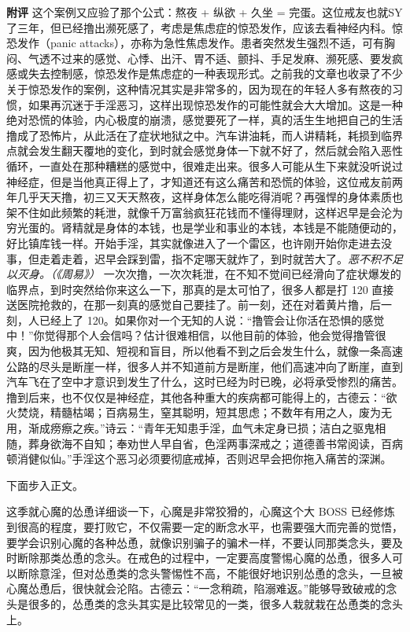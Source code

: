 \begin{case}
    \textbf{附评} 这个案例又应验了那个公式：熬夜 + 纵欲 + 久坐 = 完蛋。这位戒友也就SY了三年，但已经撸出濒死感了，考虑是焦虑症的惊恐发作，应该去看神经内科。惊恐发作（panic attacks），亦称为急性焦虑发作。患者突然发生强烈不适，可有胸闷、气透不过来的感觉、心悸、出汗、胃不适、颤抖、手足发麻、濒死感、要发疯感或失去控制感，惊恐发作是焦虑症的一种表现形式。之前我的文章也收录了不少关于惊恐发作的案例，这种情况其实是非常多的，因为现在的年轻人多有熬夜的习惯，如果再沉迷于手淫恶习，这样出现惊恐发作的可能性就会大大增加。这是一种绝对恐慌的体验，内心极度的崩溃，感觉要死了一样，真的活生生地把自己的生活撸成了恐怖片，从此活在了症状地狱之中。汽车讲油耗，而人讲精耗，耗损到临界点就会发生翻天覆地的变化，到时就会感觉身体一下就不好了，然后就会陷入恶性循环，一直处在那种糟糕的感觉中，很难走出来。很多人可能从生下来就没听说过神经症，但是当他真正得上了，才知道还有这么痛苦和恐慌的体验，这位戒友前两年几乎天天撸，初三又天天熬夜，这样身体怎么能吃得消呢？再强悍的身体素质也架不住如此频繁的耗泄，就像千万富翁疯狂花钱而不懂得理财，这样迟早是会沦为穷光蛋的。肾精就是身体的本钱，也是学业和事业的本钱，本钱是不能随便动的，好比镇库钱一样。开始手淫，其实就像进入了一个雷区，也许刚开始你走进去没事，但走着走着，迟早会踩到雷，指不定哪天就炸了，到时就苦大了。\textit{恶不积不足以灭身。（《周易》）} 一次次撸，一次次耗泄，在不知不觉间已经滑向了症状爆发的临界点，到时突然给你来这么一下，那真的是太可怕了，很多人都是打 120 直接送医院抢救的，在那一刻真的感觉自己要挂了。前一刻，还在对着黄片撸，后一刻，人已经上了 120。如果你对一个无知的人说：“撸管会让你活在恐惧的感觉中！”你觉得那个人会信吗？估计很难相信，以他目前的体验，他会觉得撸管很爽，因为他极其无知、短视和盲目，所以他看不到之后会发生什么，就像一条高速公路的尽头是断崖一样，很多人并不知道前方是断崖，他们高速冲向了断崖，直到汽车飞在了空中才意识到发生了什么，这时已经为时已晚，必将承受惨烈的痛苦。撸到后来，也不仅仅是神经症，其他各种重大的疾病都可能得上的，古德云：“欲火焚烧，精髓枯竭；百病易生，窒其聪明，短其思虑；不数年有用之人，废为无用，渐成痨瘵之疾。”诗云：“青年无知患手淫，血气未定身已损；洁白之驱鬼相随，葬身欲海不自知；奉劝世人早自省，色淫两事深戒之；道德善书常阅读，百病顿消健似仙。”手淫这个恶习必须要彻底戒掉，否则迟早会把你拖入痛苦的深渊。
\end{case}

下面步入正文。

这季就心魔的怂恿详细谈一下，心魔是非常狡猾的，心魔这个大 BOSS 已经修炼到很高的程度，要打败它，不仅需要一定的断念水平，也需要强大而完善的觉悟，要学会识别心魔的各种怂恿，就像识别骗子的骗术一样，不要认同那类念头，要及时断除那类怂恿的念头。在戒色的过程中，一定要高度警惕心魔的怂恿，很多人可以断除意淫，但对怂恿类的念头警惕性不高，不能很好地识别怂恿的念头，一旦被心魔怂恿后，很快就会沦陷。古德云：“一念稍疏，陷溺难返。”能够导致破戒的念头是很多的，怂恿类的念头其实是比较常见的一类，很多人栽就栽在怂恿类的念头上。

